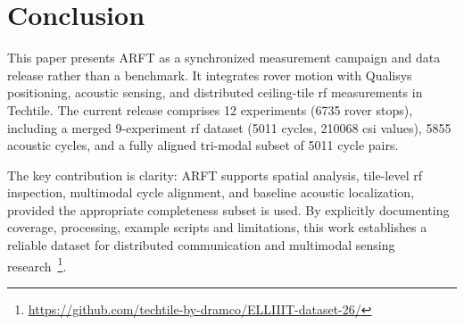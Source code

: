 \section{Conclusion}

This paper presents ARFT as a synchronized measurement campaign and data release rather than a benchmark. It integrates rover motion with Qualisys positioning, acoustic sensing, and distributed ceiling-tile \gls{rf} measurements in Techtile. The current release comprises 12 experiments (6735 rover stops), including a merged 9-experiment \gls{rf} dataset (5011 cycles, 210068 \gls{csi} values), 5855 acoustic cycles, and a fully aligned tri-modal subset of 5011 cycle pairs.

The key contribution is clarity: ARFT supports spatial analysis, tile-level \gls{rf} inspection, multimodal cycle alignment, and baseline acoustic localization, provided the appropriate completeness subset is used. By explicitly documenting coverage, processing, example scripts and limitations, this work establishes a reliable dataset for distributed communication and multimodal sensing research~\footnote{\url{https://github.com/techtile-by-dramco/ELLIIIT-dataset-26/}}.
